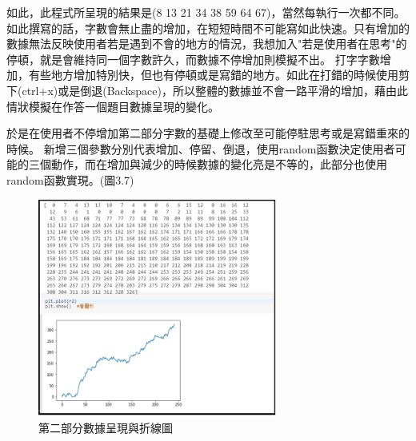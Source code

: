 如此，此程式所呈現的結果是(8 13 21 34 38 59 64 67)，當然每執行一次都不同。
如此撰寫的話，字數會無止盡的增加，在短短時間不可能寫如此快速。只有增加的數據無法反映使用者若是遇到不會的地方的情況，我想加入"若是使用者在思考"的停頓，就是會維持同一個字數許久，而數據不停增加則模擬不出。
打字字數增加，有些地方增加特別快，但也有停頓或是寫錯的地方。如此在打錯的時候使用剪下(ctrl+x)或是倒退(Backspace)，所以整體的數據並不會一路平滑的增加，藉由此情狀模擬在作答一個題目數據呈現的變化。

於是在使用者不停增加第二部分字數的基礎上修改至可能停駐思考或是寫錯重來的時候。
新增三個參數分別代表增加、停留、倒退，使用random函數決定使用者可能的三個動作，而在增加與減少的時候數據的變化亮是不等的，此部分也使用random函數實現。(圖3.7)
\begin{figure}[H] %
	\centering %
	\includegraphics[width=0.7\textwidth]{3_2_1_4.png} %
	\caption{第二部分數據呈現與折線圖} %
	\label{Fig.3.7} %
\end{figure}
